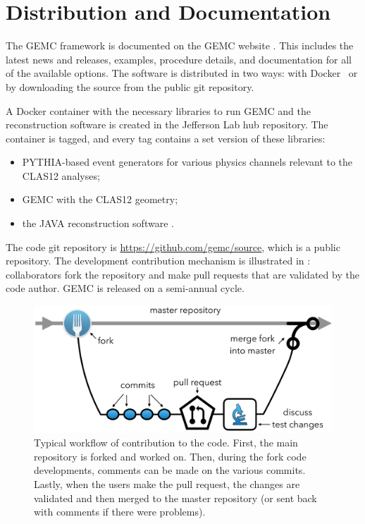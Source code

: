 \section{Distribution and Documentation}

The GEMC framework is documented on the GEMC website \cite{GEMC}. This includes the latest news and releases,
examples, procedure details, and documentation for all of the available options. The software is distributed in two ways:
with Docker~\cite{jlabDocker} or by downloading the source from the public git repository.

A Docker container with the necessary libraries to run GEMC and the reconstruction software is created in the
Jefferson Lab hub repository. The container is tagged, and every tag contains a set version of these libraries:

\begin{itemize}
	\item PYTHIA-based event generators for various physics channels relevant to the CLAS12 analyses;
	\item GEMC with the CLAS12 geometry;
	\item the JAVA reconstruction software \cite{recon-nim}.
\end{itemize}

The code git repository is \url{https://github.com/gemc/source}, which is a public repository. The development
contribution mechanism is illustrated in : collaborators fork the repository and make pull requests that are 
validated by the code author. GEMC is released on a semi-annual cycle.

\begin{figure}
	\centering
	\includegraphics[width=0.99\columnwidth,keepaspectratio]{img/github.png}
	\caption{Typical workflow of contribution to the code. First, the main repository is forked and worked on. Then,
          during the fork code developments, comments can be made on the various commits. Lastly, when the users make
          the pull request, the changes are validated and then merged to the master repository (or sent back with comments
          if there were problems).}
	\label{fig:github}
\end{figure}

